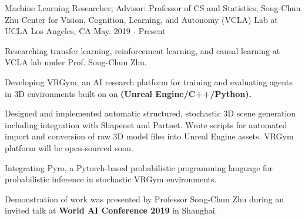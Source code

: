 \cventry
    {Machine Learning Researcher; Advisor: Professor of CS and Statistics, Song-Chun Zhu} %
    {Center for Vision, Cognition, Learning, and Autonomy (VCLA) Lab at UCLA } %
    {Los Angeles, CA} %
    {May. 2019 - Present} %
    {
    \begin{cvitems} %
        \item {Researching transfer learning, reinforcement learning, and causal learning at VCLA lab under Prof. Song-Chun Zhu.}
        \item {Developing VRGym, an AI research platform for training and evaluating agents in
        3D environments built on on \textbf{(Unreal Engine/C++/Python).} } 
        \item {Designed and implemented automatic structured, stochastic 3D scene generation including integration with Shapenet and Partnet. 
        Wrote scripts for automated import and conversion of raw 3D model files into Unreal Engine assets. VRGym platform will be open-sourced soon.}
        \item {Integrating Pyro, a Pytorch-based probabilistic programming language for probabilistic inference in stochastic VRGym environments.}
        \item {Demonstration of work was presented by Professor Song-Chun Zhu during an invited talk at \textbf{World AI Conference 2019} in Shanghai.}
    \end{cvitems}
    }
